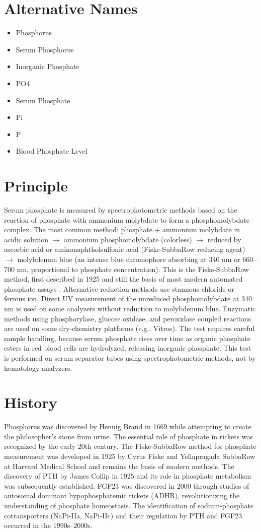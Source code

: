 \section*{Alternative Names}
\begin{itemize}
  \item Phosphorus
  \item Serum Phosphorus
  \item Inorganic Phosphate
  \item PO4
  \item Serum Phosphate
  \item Pi
  \item P
  \item Blood Phosphate Level
\end{itemize}
\section*{Principle}
Serum phosphate is measured by spectrophotometric methods based on the reaction of phosphate with ammonium molybdate to form a phosphomolybdate complex. The most common method: phosphate + ammonium molybdate in acidic solution $\rightarrow$ ammonium phosphomolybdate (colorless) $\rightarrow$ reduced by ascorbic acid or aminonaphtholsulfonic acid (Fiske-SubbaRow reducing agent) $\rightarrow$ molybdenum blue (an intense blue chromophore absorbing at 340 nm or 660--700 nm, proportional to phosphate concentration). This is the Fiske-SubbaRow method, first described in 1925 and still the basis of most modern automated phosphate assays \cite{tietz2012textbook}. Alternative reduction methods use stannous chloride or ferrous ion. Direct UV measurement of the unreduced phosphomolybdate at 340 nm is used on some analyzers without reduction to molybdenum blue. Enzymatic methods using phosphorylase, glucose oxidase, and peroxidase coupled reactions are used on some dry-chemistry platforms (e.g., Vitros). The test requires careful sample handling, because serum phosphate rises over time as organic phosphate esters in red blood cells are hydrolyzed, releasing inorganic phosphate. This test is performed on serum separator tubes using spectrophotometric methods, not by hematology analyzers.

\section*{History}
Phosphorus was discovered by Hennig Brand in 1669 while attempting to create the philosopher's stone from urine. The essential role of phosphate in rickets was recognized by the early 20th century. The Fiske-SubbaRow method for phosphate measurement was developed in 1925 by Cyrus Fiske and Yellapragada SubbaRow at Harvard Medical School and remains the basis of modern methods. The discovery of PTH by James Collip in 1925 and its role in phosphate metabolism was subsequently established. FGF23 was discovered in 2000 through studies of autosomal dominant hypophosphatemic rickets (ADHR), revolutionizing the understanding of phosphate homeostasis. The identification of sodium-phosphate cotransporters (NaPi-IIa, NaPi-IIc) and their regulation by PTH and FGF23 occurred in the 1990s--2000s.

